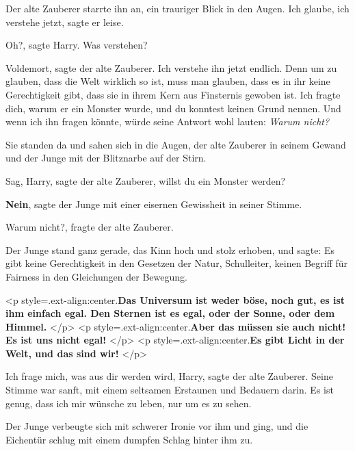 Der alte Zauberer starrte ihn an, ein trauriger Blick in den Augen. \glqq{}Ich
glaube, ich verstehe jetzt\grqq{}, sagte er leise.

\glqq{}Oh?\grqq{}, sagte Harry. \glqq{}Was verstehen?\grqq{}

\glqq{}Voldemort\grqq{}, sagte der alte Zauberer. \glqq{}Ich verstehe ihn jetzt
endlich. Denn um zu glauben, dass die Welt wirklich so ist, muss man glauben,
dass es in ihr keine Gerechtigkeit gibt, dass sie in ihrem Kern aus Finsternis
gewoben ist. Ich fragte dich, warum er ein Monster wurde, und du konntest keinen
Grund nennen. Und wenn ich ihn fragen könnte, würde seine Antwort wohl lauten:
\emph{Warum nicht?}\grqq{}

Sie standen da und sahen sich in die Augen, der alte Zauberer in seinem Gewand
und der Junge mit der Blitznarbe auf der Stirn.

\glqq{}Sag, Harry\grqq{}, sagte der alte Zauberer, \glqq{}willst du ein Monster
werden?\grqq{}

\glqq{}\textbf{Nein}\grqq{}, sagte der Junge mit einer eisernen Gewissheit in
seiner Stimme.

\glqq{}Warum nicht?\grqq{}, fragte der alte Zauberer.

Der Junge stand ganz gerade, das Kinn hoch und stolz erhoben, und sagte: \glqq
Es gibt keine Gerechtigkeit in den Gesetzen der Natur, Schulleiter, keinen
Begriff für Fairness in den Gleichungen der Bewegung.

<p style=\grqq{}.ext-align:center\grqq{}.\textbf{Das Universum ist weder böse,
noch gut, es ist ihm einfach egal. Den Sternen ist es egal, oder der Sonne, oder
dem Himmel.} </p> <p style=\grqq{}.ext-align:center\grqq{}.\textbf{Aber das
müssen sie auch nicht! Es ist uns nicht egal!} </p> <p
style=\grqq{}.ext-align:center\grqq{}.\textbf{Es gibt Licht in der Welt, und das
sind wir!}\grqq{} </p>

\glqq{}Ich frage mich, was aus dir werden wird, Harry\grqq{}, sagte der alte
Zauberer. Seine Stimme war sanft, mit einem seltsamen Erstaunen und Bedauern
darin. \glqq{}Es ist genug, dass ich mir wünsche zu leben, nur um es zu
sehen.\grqq{}

Der Junge verbeugte sich mit schwerer Ironie vor ihm und ging, und die Eichentür
schlug mit einem dumpfen Schlag hinter ihm zu.

